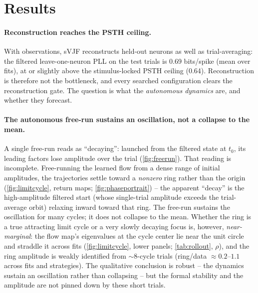 \documentclass{article}
\newcommand{\svjf}{sVJF}
\begin{document}
\section{Results}
\paragraph{Reconstruction reaches the PSTH ceiling.}
With observations, \svjf{} reconstructs held-out neurons as well as trial-averaging: the
filtered leave-one-neuron PLL on the test trials is \SI{0.69}{} bits/spike (mean over fits), at
or slightly above the stimulus-locked PSTH ceiling (\num{0.64}). Reconstruction is therefore not
the bottleneck, and every searched configuration clears the reconstruction gate. The question is
what the \emph{autonomous dynamics} are, and whether they forecast.

\paragraph{The autonomous free-run sustains an oscillation, not a collapse to the mean.}
A single free-run reads as ``decaying'': launched from the filtered state at $t_0$, its leading
factors lose amplitude over the trial (\cref{fig:freerun}). That reading is incomplete.
Free-running the learned flow from a dense range of initial amplitudes, the trajectories settle
toward a \emph{nonzero} ring rather than the origin (\cref{fig:limitcycle}, return maps;
\cref{fig:phaseportrait}) -- the apparent ``decay'' is the high-amplitude filtered start (whose
single-trial amplitude exceeds the trial-average orbit) relaxing inward toward that ring. The
free-run sustains the oscillation for many cycles; it does not collapse to the mean. Whether the
ring is a true attracting limit cycle or a very slowly decaying focus is, however,
\emph{near-marginal}: the flow map's eigenvalues at the cycle center lie near the unit circle and
straddle it across fits (\cref{fig:limitcycle}, lower panels; \cref{tab:rollout}, $\rho$), and the
ring amplitude is weakly identified from $\sim$8-cycle trials (ring/data $\approx\!0.2$--$1.1$
across fits and strategies). The qualitative conclusion is robust -- the dynamics sustain an
oscillation rather than collapsing -- but the formal stability and the amplitude are not pinned
down by these short trials.
\end{document}

